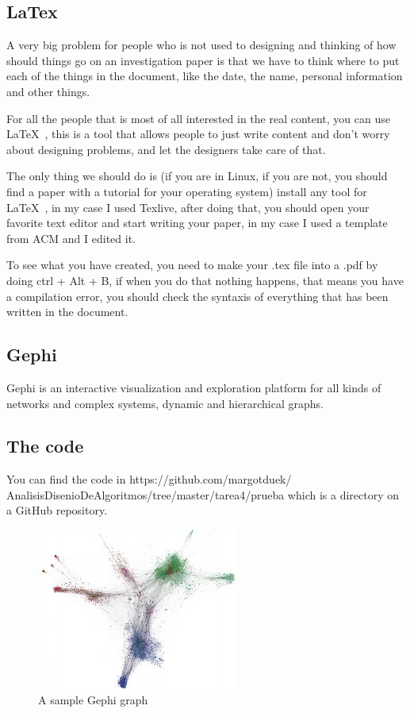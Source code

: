 \documentclass{sig-alternate-05-2015}
\begin{document}
\subsection{LaTex}
A very big problem for people who is not used to designing and thinking
of how should things go on an investigation paper is that we have to
think where to put each of the things in the document, like the date,
the name, personal information and other things.

For all the people that is most of all interested in the real
content, you can use \LaTeX\ , this is a tool that allows people
to just write content and don't worry about designing problems,
and let the designers take care of that.

The only thing we should do is (if you are in Linux, if you are not,
you should find a paper with a tutorial for your operating system)
install any tool for \LaTeX\ , in my case I used Texlive, after
doing that, you should open your favorite text editor and start
writing your paper, in my case I used a template from ACM
and I edited it.

To see what you have created, you need to make your .tex file into a
.pdf by doing ctrl + Alt + B, if when you do that nothing happens,
that means you have a compilation error, you should check the syntaxis
of everything that has been written in the document.


\subsection{Gephi}
Gephi is an interactive visualization and exploration platform
for all kinds of networks and complex systems,
dynamic and hierarchical graphs.

\subsection{The code}
You can find the code in https://github.com/margotduek/
AnalisisDisenioDeAlgoritmos/tree/master/tarea4/prueba
which is a directory on a GitHub repository.

\begin{figure}
\centering
\includegraphics{gephi}
\caption{A sample Gephi graph}
\end{figure}
\end{document}
